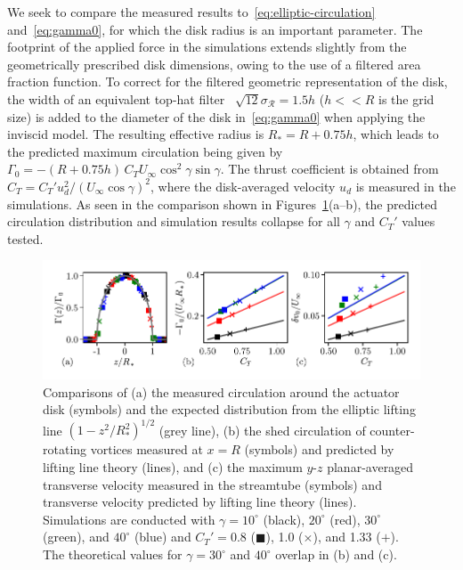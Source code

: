 We seek to compare the measured results to~\eqref{eq:elliptic-circulation} and~\eqref{eq:gamma0}, for which the disk radius is an important parameter. The footprint of the applied force in the simulations extends slightly from the geometrically prescribed disk dimensions, owing to the use of a filtered area fraction function. To correct for the filtered geometric representation of the disk, the width of an equivalent top-hat filter~\cite{Pope2000a}  $\sqrt{12}\sigma_{\mathcal{R}}=1.5h$ ($h<<R$ is the grid size) is added to the diameter of the disk in~\eqref{eq:gamma0} when applying the inviscid model. The resulting effective radius is $R_*=R+0.75 h$, which leads to the predicted maximum circulation being given by $\Gamma_0 = -(R+0.75 h) \, C_T U_\infty \cos^2\gamma \sin \gamma$. The thrust coefficient is obtained from $C_T = C_T' u_d^2/ (U_\infty \cos \gamma)^2$, where the disk-averaged velocity $u_d$ is measured in the simulations.  As seen in the comparison shown in  Figures~\ref{fig:gamma}(a--b), the predicted circulation distribution and simulation results collapse for all $\gamma$ and $C_T'$ values tested. 

\begin{figure}
\begin{center}
\includegraphics[width=\textwidth]{./fig/gamma.pdf}
\caption{\label{fig:gamma} Comparisons of (a) the measured circulation around the actuator disk (symbols) and the expected distribution from the elliptic lifting line $(1-z^2/R_*^2)^{1/2}$ (grey line), (b) the shed circulation of counter-rotating vortices measured at $x=R$ (symbols) and predicted by lifting line theory (lines), and (c)  the maximum $y$-$z$ planar-averaged transverse velocity measured in the streamtube (symbols) and transverse velocity predicted by lifting line theory (lines). Simulations are conducted with $\gamma = 10^\circ$ (black), $20^\circ$ (red), $30^\circ$ (green), and $40^\circ$ (blue) and $C_T' = 0.8$ ($\blacksquare$), 1.0 ($\times$), and 1.33 ($\bm{+}$). The theoretical values for $\gamma = 30^\circ$ and $40^\circ$ overlap in (b) and (c).}
\end{center}
\end{figure}

